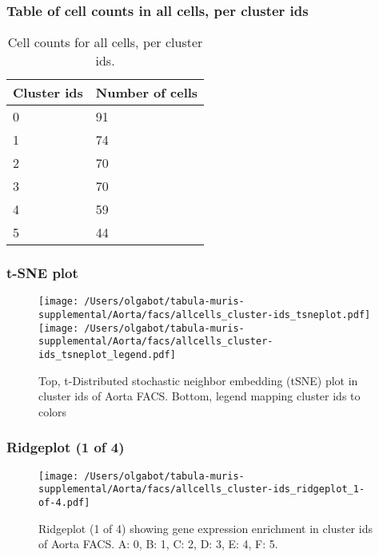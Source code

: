 \subsubsection{Table of cell counts in all cells, per cluster ids}\begin{table}[h]
\centering
\label{my-label}
\begin{tabular}{@{}ll@{}}
\toprule

Cluster ids& Number of cells \\ \midrule
0 & 91 \\

1 & 74 \\

2 & 70 \\

3 & 70 \\

4 & 59 \\

5 & 44 \\
\bottomrule
\end{tabular}
\caption{Cell counts for all cells, per cluster ids.}
\end{table}

\clearpage
\subsubsection{t-SNE plot}
\begin{figure}[h]
\centering
\texttt{[image: /Users/olgabot/tabula-muris-supplemental/Aorta/facs/allcells\_cluster-ids\_tsneplot.pdf]}
\texttt{[image: /Users/olgabot/tabula-muris-supplemental/Aorta/facs/allcells\_cluster-ids\_tsneplot\_legend.pdf]}
\caption{Top, t-Distributed stochastic neighbor embedding (tSNE) plot  in cluster ids of Aorta FACS. Bottom, legend mapping cluster ids to colors}
\end{figure}


\clearpage
\clearpage
\subsubsection{Ridgeplot (1 of 4)}
\begin{figure}[h]
\centering
\texttt{[image: /Users/olgabot/tabula-muris-supplemental/Aorta/facs/allcells\_cluster-ids\_ridgeplot\_1-of-4.pdf]}

\caption{ Ridgeplot (1 of 4)  showing gene expression enrichment in cluster ids of Aorta FACS. A: 0, B: 1, C: 2, D: 3, E: 4, F: 5.}
\end{figure}


